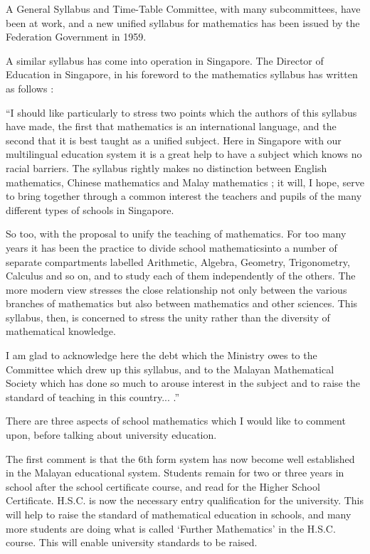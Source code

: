 A General Syllabus and Time-Table Committee, with many subcommittees,
have been at work, and a new unified syllabus for mathematics has been
issued by the Federation Government in  1959.

A similar syllabus has come into operation in Singapore. The Director
of Education in Singapore, in his foreword to the mathematics syllabus
has written as follows :

``I should like particularly to stress two points which the authors of
this syllabus have made, the first that mathematics is an
international language, and the second that it is best taught as a
unified subject. Here in Singapore with our multilingual education
system it is a great help to have a subject which knows no racial
barriers. The syllabus rightly makes no distinction between English
mathematics, Chinese mathematics and Malay mathematics ; it will, I
hope, serve to bring together through a common interest the teachers
and pupils of the many different types of schools in Singapore.

So too, with the proposal to unify the teaching of mathematics. For
too many years it has been the practice to divide school
mathematics\pageoriginale into a number of separate compartments
labelled Arithmetic, Algebra, Geometry, Trigonometry, Calculus and so
on, and to study each of them independently of the others. The more
modern view stresses the close relationship not only between the
various branches of mathematics but also between mathematics and other
sciences. This syllabus, then, is concerned to stress the unity rather
than the diversity of mathematical knowledge.

I am glad to acknowledge here the debt which the Ministry owes to the
Committee which drew up this syllabus, and to the Malayan Mathematical
Society which has done so much to arouse interest in the subject and
to raise the standard of teaching in this country... .''

There are three aspects of school mathematics which I would like to
comment upon, before talking about university education.

The first comment is that the 6th form system has now become well
established in the Malayan educational system. Students remain for two
or three years in school after the school certificate course, and read
for the Higher School Certificate. H.S.C. is now the necessary entry
qualification for the university. This will help to raise the standard
of mathematical education in schools, and many more students are doing
what is called `Further Mathematics' in the H.S.C. course. This will
enable university standards to be raised.

